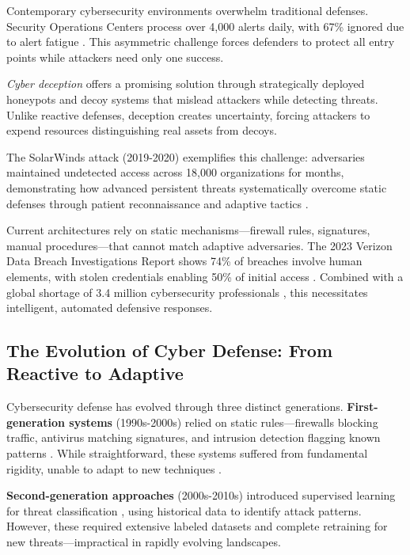 \documentclass[12pt,oneside]{article}
\begin{document}
Contemporary cybersecurity environments overwhelm traditional defenses. Security Operations Centers process over 4,000 alerts daily, with 67\% ignored due to alert fatigue \cite{vectra2023threat}. This asymmetric challenge forces defenders to protect all entry points while attackers need only one success.

\textit{Cyber deception} offers a promising solution through strategically deployed honeypots and decoy systems that mislead attackers while detecting threats. Unlike reactive defenses, deception creates uncertainty, forcing attackers to expend resources distinguishing real assets from decoys.

The SolarWinds attack (2019-2020) exemplifies this challenge: adversaries maintained undetected access across 18,000 organizations for months, demonstrating how advanced persistent threats systematically overcome static defenses through patient reconnaissance and adaptive tactics \cite{gao2021solarwinds,bitlyft2023solarwinds}. 

Current architectures rely on static mechanisms—firewall rules, signatures, manual procedures—that cannot match adaptive adversaries. The 2023 Verizon Data Breach Investigations Report shows 74\% of breaches involve human elements, with stolen credentials enabling 50\% of initial access \cite{verizon2023dbir}. Combined with a global shortage of 3.4 million cybersecurity professionals \cite{vectra2023threat}, this necessitates intelligent, automated defensive responses.


\subsection{The Evolution of Cyber Defense: From Reactive to Adaptive}

Cybersecurity defense has evolved through three distinct generations. \textbf{First-generation systems} (1990s-2000s) relied on static rules—firewalls blocking traffic, antivirus matching signatures, and intrusion detection flagging known patterns \cite{alpcan2010network}. While straightforward, these systems suffered from fundamental rigidity, unable to adapt to new techniques \cite{sommer2010outside}.

\textbf{Second-generation approaches} (2000s-2010s) introduced supervised learning for threat classification \cite{sommer2010outside}, using historical data to identify attack patterns. However, these required extensive labeled datasets and complete retraining for new threats—impractical in rapidly evolving landscapes.
\end{document}
